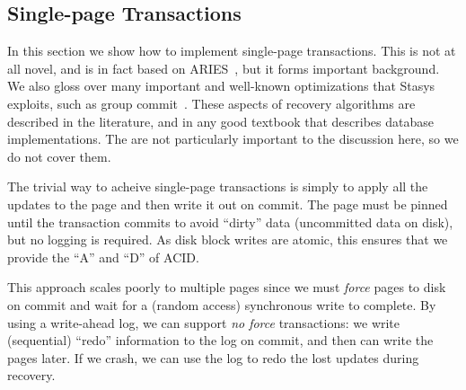 \documentclass[letterpaper,twocolumn,10pt]{article}
\newcommand{\yad}{Stasys\xspace}
\newcommand{\eat}[1]{}
\begin{document}
\eat{
\yad uses write-ahead-logging to support the
four properties of transactional storage: Atomicity, Consistency,
Isolation and Durability.  Like existing transactional storage sytems,
\yad allows applications to disable or choose different variants of each
property.

However, \yad takes customization of transactional semantics one step
further, allowing applications to add support for transactional
semantics that we have not anticipated.  We do not believe that
we can anticipate every possible variation of write-ahead-logging.  
However, we
have observed that most changes that we are interested in making
involve a few common underlying primitives.  

As we have
implemented new extensions, we have located portions of the system
that are prone to change, and have extended the API accordingly.  Our
goal is to allow applications to implement their own modules to
replace our implementations of each of the major write-ahead-logging
components.
}


\subsection{Single-page Transactions}

In this section we show how to implement single-page transactions.
This is not at all novel, and is in fact based on ARIES~\cite{aries},
but it forms important background.  We also gloss over many important
and well-known optimizations that \yad exploits, such as group
commit~\cite{group-commit}.  These aspects of recovery algorithms are
described in the literature, and in any good textbook that describes
database implementations.  The are not particularly important to the
discussion here, so we do not cover them.

The trivial way to acheive single-page transactions is simply to apply
all the updates to the page and then write it out on commit. The page
must be pinned until the transaction commits to avoid ``dirty'' data
(uncommitted data on disk), but no logging is required.  As disk
block writes are atomic, this ensures that we provide the ``A'' and ``D''
of ACID.

This approach scales poorly to multiple pages since we must {\em force} pages to disk
on commit and wait for a (random access) synchronous write to
complete. By using a write-ahead log, we can support {\em no force}
transactions: we write (sequential) ``redo'' information to the log on commit, and
then can write the  pages later. If we crash, we can use the log to
redo the lost updates during recovery.
\end{document}
